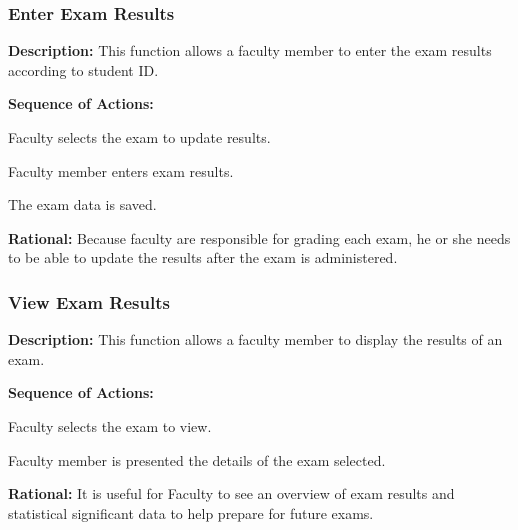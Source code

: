    \subsubsection{\large Enter Exam Results} 
   \begin{boxed} %
      \textbf{Description:}
      {\small This function allows a faculty member to enter the exam results
         according to student ID.}
         
         \textbf{Sequence of Actions:}
         \begin{enumerate}
               {\small
            \item Faculty selects the exam to update results.
            \item Faculty member enters exam results.
            \item The exam data is saved. }
         \end{enumerate}

         \textbf{Rational:}
         {\small Because faculty are responsible for grading each exam, he or she needs
         to be able to update the results after the exam is administered.}
   \end{boxed} %

   \subsubsection{\large View Exam Results} 
   \begin{boxed} %
      \textbf{Description:}
      {\small This function allows a faculty member to display the results of an
         exam.}
         
         \textbf{Sequence of Actions:}
         \begin{enumerate}
               {\small
            \item Faculty selects the exam to view.
            \item Faculty member is presented the details of the exam selected.}
         \end{enumerate}

         \textbf{Rational:}
         {\small It is useful for Faculty to see an overview of exam results and
         statistical significant data to help prepare for future exams.}
   \end{boxed} %

